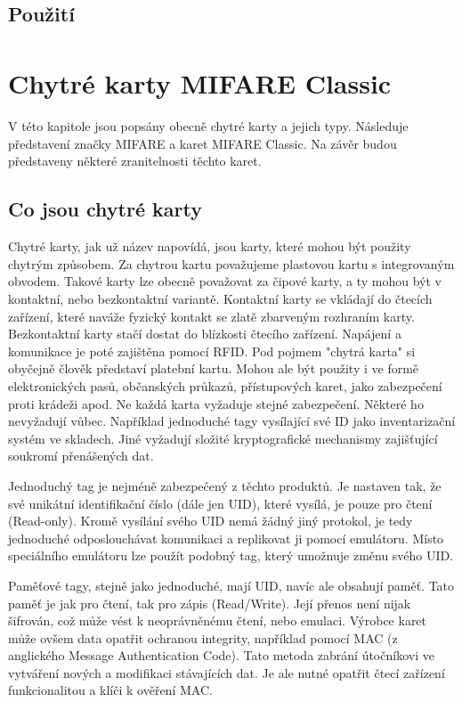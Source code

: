 \section{Použití}

              
\chapter{Chytré karty MIFARE Classic\textsuperscript{\textregistered}}
\label{chytre_karty}
V této kapitole jsou popsány obecně chytré karty a jejich typy. Následuje představení značky MIFARE a karet MIFARE Classic. Na závěr budou představeny některé zranitelnosti těchto karet.

\section{Co jsou chytré karty}
Chytré karty, jak už název napovídá, jsou karty, které mohou být použity chytrým způsobem. Za chytrou kartu považujeme plastovou kartu s integrovaným obvodem. Takové karty lze obecně považovat za čipové karty, a ty mohou být v kontaktní, nebo bezkontaktní variantě. Kontaktní karty se vkládají do čtecích zařízení, které naváže fyzický kontakt se zlatě zbarveným rozhraním karty. Bezkontaktní karty stačí dostat do blízkosti čtecího zařízení. Napájení a komunikace je poté zajištěna pomocí RFID. Pod pojmem "chytrá karta" si obyčejně člověk představí platební kartu. Mohou ale být použity i ve formě elektronických pasů, občanských průkazů, přístupových karet, jako zabezpečení proti krádeži apod. Ne každá karta vyžaduje stejné zabezpečení. Některé ho nevyžadují vůbec. Například jednoduché tagy vysílající své ID jako inventarizační systém ve skladech. Jiné vyžadují složité  kryptografické mechanismy zajišťující soukromí přenášených dat. 
\par
Jednoduchý tag je nejméně zabezpečený z těchto produktů. Je nastaven tak, že své unikátní identifikační číslo (dále jen UID), které vysílá, je pouze pro čtení {(Read-only)}. Kromě vysílání svého UID nemá žádný jiný protokol, je tedy jednoduché odposlouchávat komunikaci a replikovat ji pomocí emulátoru. Místo speciálního emulátoru lze použít podobný tag, který umožnuje změnu svého UID.
\par
Paměťové tagy, stejně jako jednoduché, mají UID, navíc ale obsahují paměť. Tato paměť je jak pro čtení, tak pro zápis {(Read/Write)}. Její přenos není nijak šifrován, což může vést k neoprávněnému čtení, nebo emulaci. Výrobce karet může ovšem data opatřit ochranou integrity, například pomocí MAC (z anglického Message Authentication Code). Tato metoda zabrání útočníkovi ve vytváření nových a modifikaci stávajících dat. Je ale nutné opatřit čtecí zařízení funkcionalitou a klíči k ověření MAC\cite{Mifare_Classic_story}.
